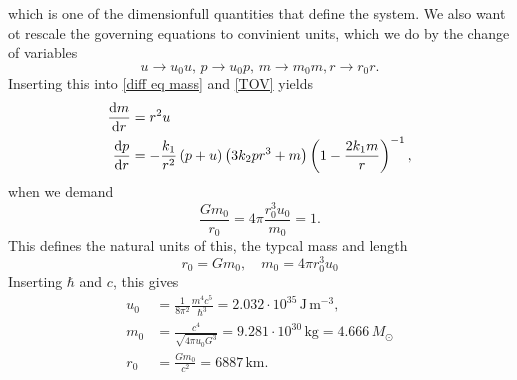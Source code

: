 %
which is one of the dimensionfull quantities that define the system.
We also want ot rescale the governing equations to convinient units, which we do by the change of variables
%
\begin{equation}
    u \rightarrow u_0 u, \, p \rightarrow u_0 p, \, m \rightarrow m_0 m, r \rightarrow r_0 r.
\end{equation}
%
Inserting this into \autoref{diff eq mass} and \autoref{TOV} yields
%
\begin{align}
    \diff{m}{r} & = r^2 u \\
    \diff{p}{r} & 
    = - \frac{k_1}{r^2} \left(p + u\right) \left(3 k_2 pr^3 + m\right) 
    \left(1 - \frac{2 k_1 m}{r}\right)^{-1},
\end{align}
%
when we demand
%
\begin{equation}
    \frac{G m_0}{r_0} = 4 \pi \frac{r_0^3 u_0}{m_0} = 1.
\end{equation}
%
This defines the natural units of this, the typcal mass and length
\begin{equation}
    r_0 = G m_0, \quad m_0 = 4 \pi r_0^3 u_0
\end{equation}
%
Inserting $\hbar$ and $c$, this gives
%
\begin{align}
    u_0 &= \frac{1}{8 \pi^2}\frac{m^4 c^5}{\hbar^3} 
    = 2.032\cdot10^{35}  \, \text{J}\,\text{m}^{-3}, \\
    m_0 &= \frac{c^4}{\sqrt{4 \pi u_0 G^3} } 
    = 9.281 \cdot 10^{30} \, \text{kg}
    = 4.666 \, M_\odot \\
    r_0 &= \frac{G m_0}{c^2} = 6887 \, \text{km}.
\end{align}

